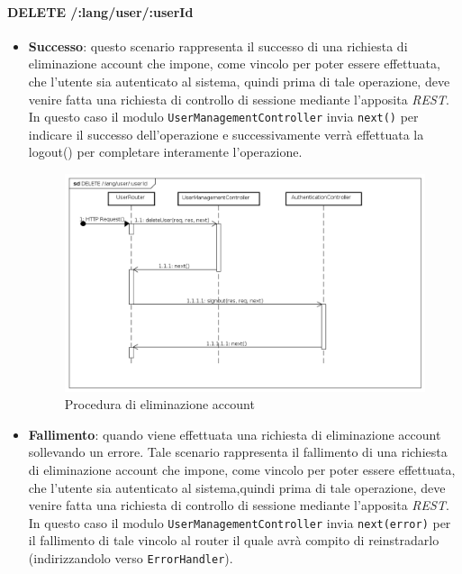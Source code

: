 
\paragraph{DELETE /:lang/user/:userId}
\begin{itemize}
\item \textbf{Successo}: questo scenario rappresenta il successo di una richiesta di eliminazione account che impone, come vincolo per poter essere effettuata, che l'utente sia autenticato al sistema, quindi prima di tale operazione, deve venire fatta una richiesta di controllo di sessione mediante l'apposita \textit{REST}.
In questo caso il modulo \texttt{UserManagementController} invia \texttt{next()} per indicare il successo dell'operazione e successivamente verrà effettuata la logout() per completare interamente l'operazione.
\label{Procedura di eliminazione account}
\begin{figure}[ht]
	\centering
	\includegraphics[scale=0.40]{UML/DiagrammiDiSequenza/Back-end/DELETE_LangUserUseridSuccess.png}
	\caption{Procedura di eliminazione account}
\end{figure}
\FloatBarrier

\item \textbf{Fallimento}: quando viene effettuata una richiesta di eliminazione account sollevando un errore. Tale scenario rappresenta il fallimento di una richiesta di eliminazione account che impone, come vincolo per poter essere effettuata, che l'utente sia autenticato al sistema,quindi prima di tale operazione, deve venire fatta una richiesta di controllo di sessione mediante l'apposita \textit{REST}. In questo caso il modulo \texttt{UserManagementController} invia \texttt{next(error)} per il fallimento di tale vincolo al router il quale avrà compito di reinstradarlo (indirizzandolo verso \texttt{ErrorHandler}).


\end{itemize}
